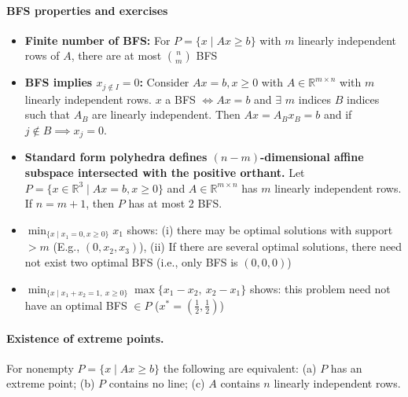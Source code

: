 \documentclass{article}
\begin{document}
\paragraph{BFS properties and exercises}
\begin{itemize}
    \item \textbf{Finite number of BFS:} For $P = \{x \mid Ax \geq b\}$ with $m$ linearly independent rows of $A$, there are at most $\binom{n}{m}$ BFS
    
    \item \textbf{BFS implies $x_{j \notin I} = 0$:} Consider $Ax = b, x\geq 0$ with $A\in \mathbb R^{m\times n}$ with $m$ linearly independent rows. $x$ a BFS $\iff Ax = b$ and $\exists$ $m$ indices $B$ indices such that $A_B$ are linearly independent. Then $Ax = A_Bx_B = b$ and if $j \notin B \implies x_j = 0$.
    

    \item \textbf{Standard form polyhedra defines $(n-m)$-dimensional affine subspace intersected with the positive orthant.} Let $P = \{x\in \mathbb R^3\mid Ax=b, x\geq0\}$ and $A\in\mathbb R^{m\times n}$ has $m$ linearly independent rows. If $n=m+1$, then $P$ has at most 2 BFS.
    
    \item $\min_{\{x\mid x_1 = 0, x\geq0\}}x_1$ shows: (i) there may be optimal solutions with support $>m$ (E.g., $(0, x_2, x_3)$), (ii) If there are several optimal solutions, there need not exist two optimal BFS (i.e., only BFS is $(0,0,0)$)
    
    \item $\min_{\{x\mid x_1 + x_2 = 1,\ x\geq 0\}}\max\{x_1 - x_2,\ x_2 - x_1\}$ shows: this problem need not have an optimal BFS $\in P$ ($x^* = (\tfrac{1}{2},\tfrac{1}{2})$)
\end{itemize}

\paragraph{Existence of extreme points.}
For nonempty $P=\{x\mid Ax\ge b\}$ the following are equivalent:
(a) $P$ has an extreme point;
(b) $P$ contains no line;
(c) $A$ contains $n$ linearly independent rows.
\end{document}
